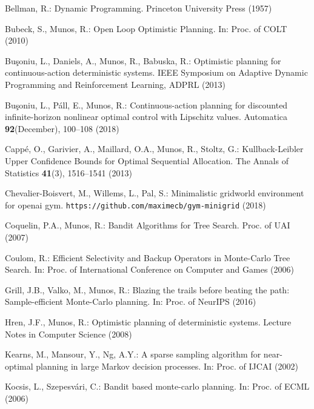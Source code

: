 \documentclass[runningheads]{llncs}
\begin{document}

\begin{thebibliography}{10}
\providecommand{\url}[1]{\texttt{#1}}
\providecommand{\urlprefix}{URL }
\providecommand{\doi}[1]{https://doi.org/#1}

Bellman, R.: {Dynamic Programming}. Princeton University Press  (1957)

Bubeck, S., Munos, R.: {Open Loop Optimistic Planning}. In: Proc. of COLT
  (2010)

Buşoniu, L., Daniels, A., Munos, R., Babuska, R.: {Optimistic planning for
  continuous-action deterministic systems}. IEEE Symposium on Adaptive Dynamic
  Programming and Reinforcement Learning, ADPRL  (2013)

Buşoniu, L., P{\'{a}}ll, E., Munos, R.: {Continuous-action planning for
  discounted infinite-horizon nonlinear optimal control with Lipschitz values}.
  Automatica  \textbf{92}(December),  100--108 (2018)

Capp{\'{e}}, O., Garivier, A., Maillard, O.A., Munos, R., Stoltz, G.:
  {Kullback-Leibler Upper Confidence Bounds for Optimal Sequential Allocation}.
  The Annals of Statistics  \textbf{41}(3),  1516--1541 (2013)

Chevalier-Boisvert, M., Willems, L., Pal, S.: Minimalistic gridworld
  environment for openai gym. \url{https://github.com/maximecb/gym-minigrid}
  (2018)

Coquelin, P.A., Munos, R.: {Bandit Algorithms for Tree Search}. Proc. of UAI
  (2007)

Coulom, R.: {Efficient Selectivity and Backup Operators in Monte-Carlo Tree
  Search}. In: {Proc. of International Conference on Computer and Games} (2006)

Grill, J.B., Valko, M., Munos, R.: {Blazing the trails before beating the path:
  Sample-efficient Monte-Carlo planning}. In: Proc. of NeurIPS (2016)

Hren, J.F., Munos, R.: {Optimistic planning of deterministic systems}. Lecture
  Notes in Computer Science  (2008)

Kearns, M., Mansour, Y., Ng, A.Y.: {A sparse sampling algorithm for
  near-optimal planning in large Markov decision processes}. In: Proc. of IJCAI
  (2002)

Kocsis, L., Szepesv\'{a}ri, C.: Bandit based monte-carlo planning. In: Proc. of
  ECML (2006)


\end{thebibliography}
\end{document}
